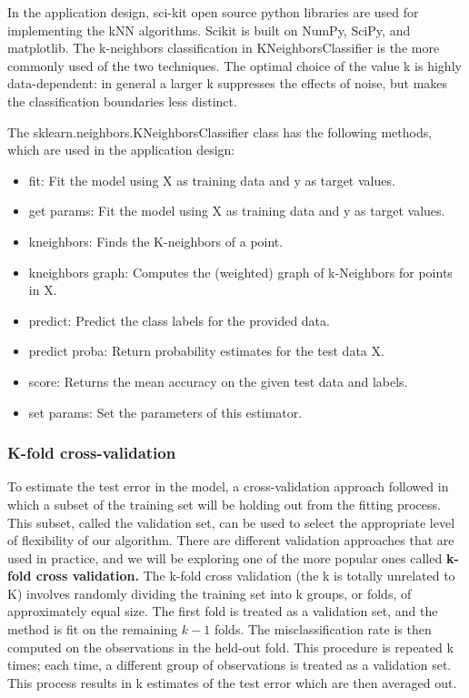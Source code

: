 \documentclass[sigconf]{acmart}
\begin{document}
In the application design, sci-kit open source python libraries are used for implementing the kNN algorithms. Scikit is built on NumPy, SciPy, and matplotlib. The k-neighbors classification in KNeighborsClassifier is the more commonly used of the two techniques. The optimal choice of the value k is highly data-dependent: in general a larger k suppresses the effects of noise, but makes the classification boundaries less distinct.

The sklearn.neighbors.KNeighborsClassifier class has the following methods, which are used in the application design:

\begin{itemize}
\item fit: Fit the model using X as training data and y as target values.
\item get params: Fit the model using X as training data and y as target values.
\item kneighbors: Finds the K-neighbors of a point.
\item kneighbors graph: Computes the (weighted) graph of k-Neighbors for points in X.
\item predict: Predict the class labels for the provided data.
\item predict proba: Return probability estimates for the test data X.
\item score: Returns the mean accuracy on the given test data and labels.
\item set params: Set the parameters of this estimator.
\end{itemize}

\subsubsection{K-fold cross-validation}
To estimate the test error in the model, a cross-validation approach followed in which a subset of the training set will be holding out from the fitting process. This subset, called the validation set, can be used to select the appropriate level of flexibility of our algorithm. There are different validation approaches that are used in practice, and we will be exploring one of the more popular ones called \textbf{k-fold cross validation.}
The k-fold cross validation (the k is totally unrelated to K) involves randomly dividing the training set into k groups, or folds, of approximately equal size. The first fold is treated as a validation set, and the method is fit on the remaining \(k-1\) folds. The misclassification rate is then computed on the observations in the held-out fold. This procedure is repeated k times; each time, a different group of observations is treated as a validation set. This process results in k estimates of the test error which are then averaged out. 
\end{document}
